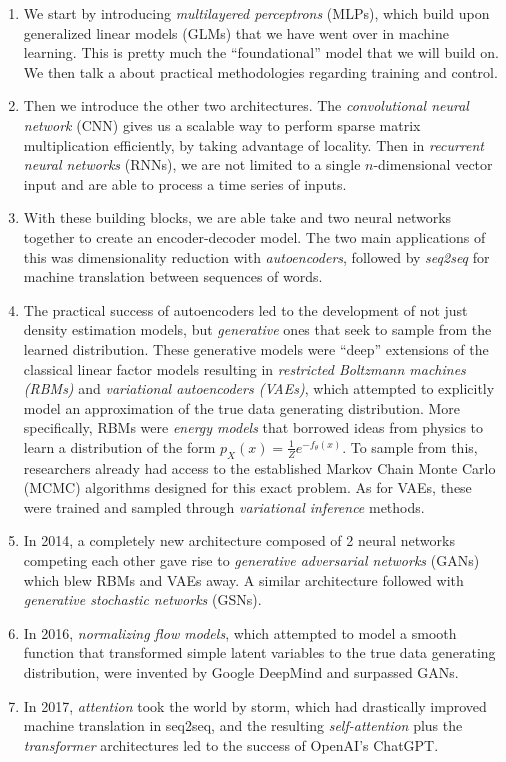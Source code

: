 \begin{enumerate}
  \item We start by introducing \textit{multilayered perceptrons} (MLPs), which build upon generalized linear models (GLMs) that we have went over in machine learning. This is pretty much the ``foundational'' model that we will build on. We then talk a about practical methodologies regarding training and control. 

  \item Then we introduce the other two architectures. The \textit{convolutional neural network} (CNN) gives us a scalable way to perform sparse matrix multiplication efficiently, by taking advantage of locality. Then in \textit{recurrent neural networks} (RNNs), we are not limited to a single $n$-dimensional vector input and are able to process a time series of inputs.  
    
  \item With these building blocks, we are able take and two neural networks together to create an encoder-decoder model. The two main applications of this was dimensionality reduction with \textit{autoencoders}, followed by \textit{seq2seq} for machine translation between sequences of words.  

  \item The practical success of autoencoders led to the development of not just density estimation models, but \textit{generative} ones that seek to sample from the learned distribution. These generative models were ``deep'' extensions of the classical linear factor models resulting in \textit{restricted Boltzmann machines (RBMs)} and \textit{variational autoencoders (VAEs)}, which attempted to explicitly model an approximation of the true data generating distribution. More specifically, RBMs were \textit{energy models} that borrowed ideas from physics to learn a distribution of the form $p_X (x) = \frac{1}{Z} e^{-f_\theta (x)}$. To sample from this, researchers already had access to the established Markov Chain Monte Carlo (MCMC) algorithms designed for this exact problem. As for VAEs, these were trained and sampled through \textit{variational inference} methods. 

  \item In 2014, a completely new architecture composed of 2 neural networks competing each other gave rise to \textit{generative adversarial networks} (GANs) which blew RBMs and VAEs away. A similar architecture followed with \textit{generative stochastic networks} (GSNs).

  \item In 2016, \textit{normalizing flow models}, which attempted to model a smooth function that transformed simple latent variables to the true data generating distribution, were invented by Google DeepMind and surpassed GANs. 

  \item In 2017, \textit{attention} took the world by storm, which had drastically improved machine translation in seq2seq, and the resulting \textit{self-attention} plus the \textit{transformer} architectures led to the success of OpenAI's ChatGPT. 
\end{enumerate} 


